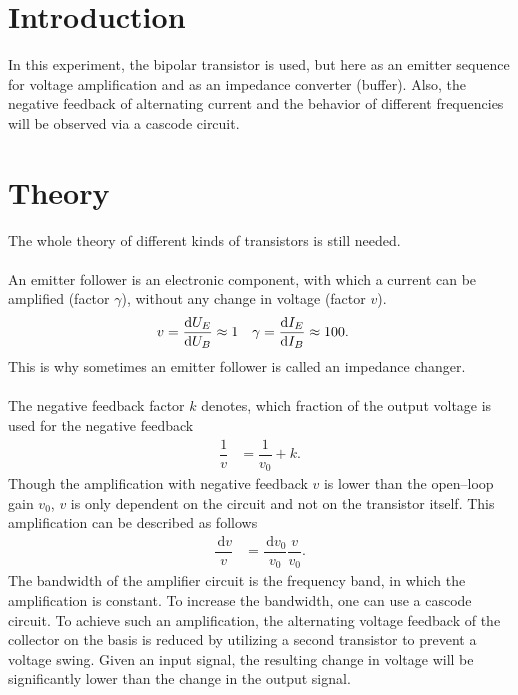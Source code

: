\documentclass[a4paper,10pt]{article}
\newcommand{\td}{\,\text{d}}
\numberwithin{equation}{section}
\begin{document}
\begin{multicols}{2}
        \sloppy
        \section{Introduction}
        In this experiment, the bipolar transistor is used, but here as an emitter sequence for voltage amplification and as an impedance converter (buffer).
        Also, the negative feedback of alternating current and the behavior of different frequencies will be observed via a cascode circuit.

        \section{Theory}
        The whole theory of different kinds of transistors is still needed.
        \\\\An emitter follower is an electronic component, with which a current can be amplified (factor $\gamma $), without any change in voltage (factor $v$).
        \begin{align} 
                v &= \diff[]{U_E}{U_B}\approx 1 & \gamma &= \diff[]{I_E}{I_B}\approx 100
        .\end{align} 
        This is why sometimes an emitter follower is called an impedance changer.
        \\\\ The negative feedback factor $k$ denotes, which fraction of the output voltage is used for the negative feedback
        \begin{align} 
                \dfrac{1}{v} &= \dfrac{1}{v_0}+k
        .\end{align} 
        Though the amplification with negative feedback $v$ is lower than the open--loop gain $v_0$, $v$ is only dependent on the circuit and not on the transistor itself.
        This amplification can be described as follows
        \begin{align} 
                \dfrac{\td v}{v} &= \dfrac{\td v_0}{v_0}\dfrac{v}{v_0}
        .\end{align} 
        The bandwidth of the amplifier circuit is the frequency band, in which the amplification is constant.
        To increase the bandwidth, one can use a cascode circuit.
        To achieve such an amplification, the alternating voltage feedback of the collector on the basis is reduced by utilizing a second transistor to prevent a voltage swing.
        Given an input signal, the resulting change in voltage will be significantly lower than the change in the output signal.

\end{multicols}
\end{document}
